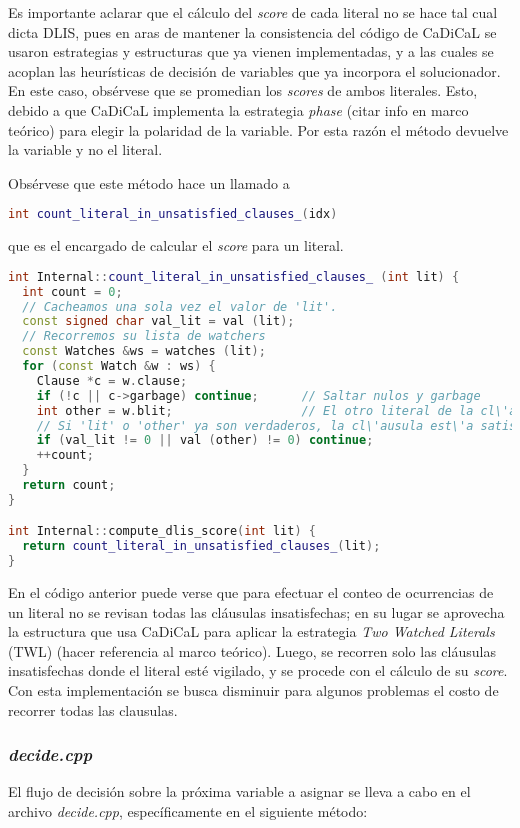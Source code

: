 Es importante aclarar que el c\'alculo del \textit{score} de cada literal no se hace tal cual dicta DLIS, pues en aras de mantener la consistencia del c\'odigo de CaDiCaL se usaron estrategias y estructuras que ya vienen implementadas, y a las cuales se acoplan las heur\'isticas de decisi\'on de variables que ya incorpora el solucionador. En este caso, obs\'ervese que se promedian los \textit{scores} de ambos literales. Esto, debido a que CaDiCaL implementa la estrategia \textit{phase} (citar info en marco te\'orico) para elegir la polaridad de la variable. Por esta raz\'on el m\'etodo devuelve la variable y no el literal.

Obs\'ervese que este m\'etodo hace un llamado a \begin{lstlisting}[escapechar=!., language=C++]
int count_literal_in_unsatisfied_clauses_(idx)
\end{lstlisting} 
que es el encargado de calcular el \textit{score} para un literal.

\begin{lstlisting}[escapechar=!., language=C++]
int Internal::count_literal_in_unsatisfied_clauses_ (int lit) {
  int count = 0;
  // Cacheamos una sola vez el valor de 'lit'.
  const signed char val_lit = val (lit);
  // Recorremos su lista de watchers
  const Watches &ws = watches (lit);
  for (const Watch &w : ws) {
    Clause *c = w.clause;                
    if (!c || c->garbage) continue;      // Saltar nulos y garbage
    int other = w.blit;                  // El otro literal de la cl\'ausula
    // Si 'lit' o 'other' ya son verdaderos, la cl\'ausula est\'a satisfecha
    if (val_lit != 0 || val (other) != 0) continue;
    ++count;
  }
  return count;
}

int Internal::compute_dlis_score(int lit) {
  return count_literal_in_unsatisfied_clauses_(lit);
}
\end{lstlisting}

En el c\'odigo anterior puede verse que para efectuar el conteo de ocurrencias de un literal no se revisan todas las cl\'ausulas insatisfechas; en su lugar se aprovecha la estructura que usa CaDiCaL para aplicar la estrategia \textit{Two Watched Literals} (TWL) (hacer referencia al marco te\'orico). Luego, se recorren solo las cl\'ausulas insatisfechas donde el literal est\'e vigilado, y se procede con el c\'alculo de su \textit{score}. Con esta implementaci\'on se busca disminuir para algunos problemas el costo de recorrer todas las clausulas.

\subsubsection{\textit{decide.cpp}}
El flujo de decisi\'on sobre la pr\'oxima variable a asignar se lleva a cabo en el archivo \textit{decide.cpp}, espec\'ificamente en el siguiente m\'etodo:

